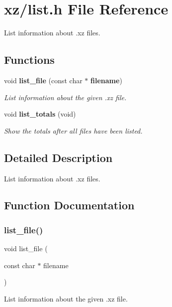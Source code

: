 \section{xz/list.h File Reference}
\label{list_8h}


List information about .xz files.  


\subsection*{Functions}
\begin{DoxyCompactItemize}
\item 
void \textbf{ list\+\_\+file} (const char $\ast$\textbf{ filename})
\begin{DoxyCompactList}\small\item\em List information about the given .xz file. \end{DoxyCompactList}\item 
void \textbf{ list\+\_\+totals} (void)
\begin{DoxyCompactList}\small\item\em Show the totals after all files have been listed. \end{DoxyCompactList}\end{DoxyCompactItemize}


\subsection{Detailed Description}
List information about .xz files. 



\subsection{Function Documentation}
\mbox{\label{list_8h_a2b9bdcc3cdcc48e99a29e178df9d4899}} 
\subsubsection{list\+\_\+file()}
{\footnotesize\ttfamily void list\+\_\+file (\begin{DoxyParamCaption}\item[{const char $\ast$}]{filename }\end{DoxyParamCaption})}



List information about the given .xz file. 



